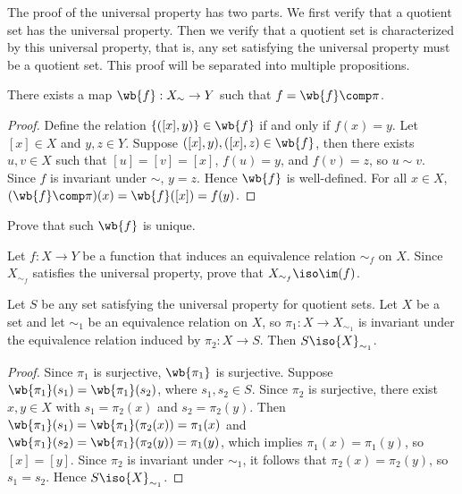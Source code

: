 \documentclass[10pt]{article}
\begin{document}
The proof of the universal property has two parts. We first verify that a quotient set has the universal property. Then we verify that a quotient set is characterized by this universal property, that is, any set satisfying the universal property must be a quotient set. This proof will be separated into multiple propositions.
\begin{proposition}
    There exists a map $\wb{f}:{X}_{\sim}\to Y$ such that $f=\wb{f}\comp\pi$.
\end{proposition}
\begin{proof}
    Define the relation $\{([x],y)\}\in\wb{f}$ if and only if $f(x)=y$. Let $[x]\in X$ and $y,z\in Y$. Suppose $([x],y),([x],z)\in\wb{f}$, then there exists $u,v\in X$ such that $[u]=[v]=[x]$, $f(u)=y$, and $f(v)=z$, so $u\sim v$. Since $f$ is invariant under $\sim$, $y=z$. Hence $\wb{f}$ is well-defined. For all $x\in X$, $(\wb{f}\comp\pi)(x)=\wb{f}([x])=f(y)$.
\end{proof}
\begin{problem}
    Prove that such $\wb{f}$ is unique.
\end{problem}
\begin{problem}
    Let $f:X\to Y$ be a function that induces an equivalence relation ${\sim_{f}}$ on $X$. Since ${X}_{{\sim}_{f}}$ satisfies the universal property, prove that ${X}_{{\sim}_{f}}\iso\im(f)$.
\end{problem}
\begin{proposition}
    Let $S$ be any set satisfying the universal property for quotient sets. Let $X$ be a set and let ${\sim}_{1}$ be an equivalence relation on $X$, so ${\pi}_{1}:X\to{X}_{{\sim}_{1}}$ is invariant under the equivalence relation induced by ${\pi}_{2}:X\to S$. Then $S\iso{X}_{{\sim}_{1}}$.
\end{proposition}
\begin{center}
\end{center}
\begin{proof}
    Since ${\pi}_{1}$ is surjective, $\wb{{\pi}_{1}}$ is surjective. Suppose $\wb{{\pi}_{1}}({s}_{1})=\wb{{\pi}_{1}}({s}_{2})$, where ${s}_{1}, {s}_{2}\in S$. Since $\pi_2$ is surjective, there exist $x,y\in X$ with ${s}_{1}={\pi}_{2}(x)$ and ${s}_{2}={\pi}_{2}(y)$. Then $\wb{{\pi}_{1}}({s}_{1})=\wb{{\pi}_{1}}({\pi}_{2}(x))={\pi}_{1}(x)$ and $\wb{{\pi}_{1}}({s}_{2})=\wb{{\pi}_{1}}({\pi}_{2}(y))={\pi}_{1}(y)$, which implies ${\pi}_{1}(x)={\pi}_{1}(y)$, so $[x]=[y]$. Since ${\pi}_{2}$ is invariant under ${\sim}_{1}$, it follows that ${\pi}_{2}(x)={\pi}_{2}(y)$, so ${s}_{1}={s}_{2}$. Hence $S\iso{X}_{{\sim}_{1}}$.        
\end{proof}
\end{document}
